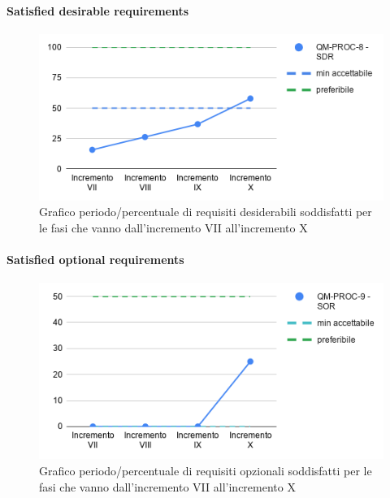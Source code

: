 \paragraph{Satisfied desirable requirements}
	\begin{figure}[H]
			\centering
			\includegraphics[width=0.8\linewidth]{./res/images/QM-PROC-8-SDR.png}
			\caption{Grafico periodo/percentuale di requisiti desiderabili soddisfatti per le fasi che vanno dall'incremento VII all'incremento X}
			\label{fig:Grafico periodo/percentuale di requisiti desiderabili soddisfatti per le fasi che vanno dall'incremento VII all'incremento X}
	\end{figure}
\paragraph{Satisfied optional requirements}
	\begin{figure}[H]
			\centering
			\includegraphics[width=0.8\linewidth]{./res/images/QM-PROC-9-SOR.png}
			\caption{Grafico periodo/percentuale di requisiti opzionali soddisfatti per le fasi che vanno dall'incremento VII all'incremento X}
			\label{fig:Grafico periodo/percentuale di requisiti opzionali soddisfatti per le fasi che vanno dall'incremento VII all'incremento X}
	\end{figure}
